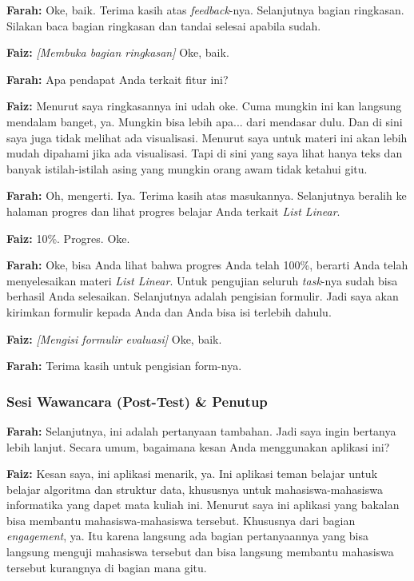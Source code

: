 \textbf{Farah:} Oke, baik. Terima kasih atas \textit{feedback}-nya. Selanjutnya bagian ringkasan. Silakan baca bagian ringkasan dan tandai selesai apabila sudah.

\textbf{Faiz:} \textit{[Membuka bagian ringkasan]} Oke, baik.

\textbf{Farah:} Apa pendapat Anda terkait fitur ini?

\textbf{Faiz:} Menurut saya ringkasannya ini udah oke. Cuma mungkin ini kan langsung mendalam banget, ya. Mungkin bisa lebih apa... dari mendasar dulu. Dan di sini saya juga tidak melihat ada visualisasi. Menurut saya untuk materi ini akan lebih mudah dipahami jika ada visualisasi. Tapi di sini yang saya lihat hanya teks dan banyak istilah-istilah asing yang mungkin orang awam tidak ketahui gitu.

\textbf{Farah:} Oh, mengerti. Iya. Terima kasih atas masukannya. Selanjutnya beralih ke halaman progres dan lihat progres belajar Anda terkait \textit{List Linear}.

\textbf{Faiz:} 10\%. Progres. Oke.

\textbf{Farah:} Oke, bisa Anda lihat bahwa progres Anda telah 100\%, berarti Anda telah menyelesaikan materi \textit{List Linear}. Untuk pengujian seluruh \textit{task}-nya sudah bisa berhasil Anda selesaikan. Selanjutnya adalah pengisian formulir. Jadi saya akan kirimkan formulir kepada Anda dan Anda bisa isi terlebih dahulu.

\textbf{Faiz:} \textit{[Mengisi formulir evaluasi]} Oke, baik.

\textbf{Farah:} Terima kasih untuk pengisian form-nya.

\subsubsection*{Sesi Wawancara (Post-Test) \& Penutup}

\textbf{Farah:} Selanjutnya, ini adalah pertanyaan tambahan. Jadi saya ingin bertanya lebih lanjut. Secara umum, bagaimana kesan Anda menggunakan aplikasi ini?

\textbf{Faiz:} Kesan saya, ini aplikasi menarik, ya. Ini aplikasi teman belajar untuk belajar algoritma dan struktur data, khususnya untuk mahasiswa-mahasiswa informatika yang dapet mata kuliah ini. Menurut saya ini aplikasi yang bakalan bisa membantu mahasiswa-mahasiswa tersebut. Khususnya dari bagian \textit{engagement}, ya. Itu karena langsung ada bagian pertanyaannya yang bisa langsung menguji mahasiswa tersebut dan bisa langsung membantu mahasiswa tersebut kurangnya di bagian mana gitu.


